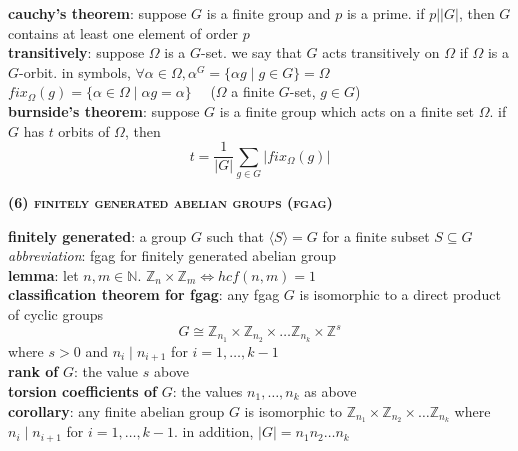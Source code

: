 \documentclass[a4paper]{article}
\newcommand\abs[1]{\ensuremath{\lvert#1\rvert}}
\newcommand\divides{\ensuremath{\big|}}
\begin{document}
\begin{multicols}{2}
\begin{framed}
	\noindent
	\textbf{cauchy's theorem}: suppose $G$ is a finite group and $p$ is a prime. if $p \divides \abs{G}$, then $G$ contains at least one element of order $p$\\
	
	\noindent
	\textbf{transitively}: suppose $\Omega$ is a $G$-set. we say that $G$ acts transitively on $\Omega$ if $\Omega$ is a $G$-orbit. in symbols, $\forall \alpha \in \Omega, \alpha^G = \{\alpha g \; \vert \; g \in G\} = \Omega$\\
	
	\noindent
	$fix_\Omega(g) = \{\alpha \in \Omega \; \vert \; \alpha g = \alpha\} \quad$ ($\Omega$ a finite $G$-set, $g \in G$)\\
	
	\noindent
	\textbf{burnside's theorem}: suppose $G$ is a finite group which acts on a finite set $\Omega$. if $G$ has $t$ orbits of $\Omega$, then
	$$t = \frac{1}{\abs{G}}\sum_{g \in G}\abs{fix_\Omega(g)}$$	
\end{framed}


\begin{framed}
	\begin{center}
		\textbf{\textsc{(6) finitely generated abelian groups (fgag)}}
	\end{center}
	
	\noindent
	\textbf{finitely generated}: a group $G$ such that $\langle S \rangle = G$ for a finite subset $S \subseteq G$\\
	\textit{abbreviation}: fgag for finitely generated abelian group\\
	
	\noindent
	\textbf{lemma}: let $n, m \in \mathbb{N}$. $\mathbb{Z}_n \times \mathbb{Z}_m \iff hcf(n, m) = 1$\\
	
	\noindent
	\textbf{classification theorem for fgag}: any fgag $G$ is isomorphic to a direct product of cyclic groups
	$$G \cong \mathbb{Z}_{n_1} \times \mathbb{Z}_{n_2} \times \dots \mathbb{Z}_{n_k} \times \mathbb{Z}^s$$
	where $s > 0$ and $n_i \; \vert \; n_{i + 1}$ for $i = 1, \dots, k - 1$\\
	
	\noindent
	\textbf{rank of} $G$: the value $s$ above\\
	\textbf{torsion coefficients of} $G$: the values $n_1, \dots, n_k$ as above\\
	
	\noindent
	\textbf{corollary}: any finite abelian group $G$ is isomorphic to $\mathbb{Z}_{n_1} \times \mathbb{Z}_{n_2} \times \dots \mathbb{Z}_{n_k}$ where $n_i \; \vert \; n_{i + 1}$ for $i = 1, \dots, k - 1$. in addition, $\abs{G} = n_1 n_2 \dots n_k$\\
	

\end{framed}
\end{multicols}
\end{document}
